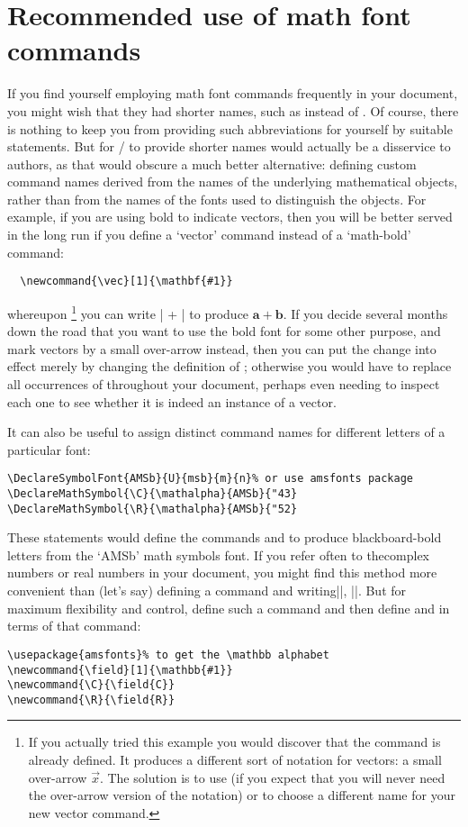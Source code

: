 \documentclass[leqno,titlepage,openany]{amsldoc}
\let\vector=\vec
\renewcommand{\vec}[1]{\mathbf{#1}}
\begin{document}
\section{Recommended use of math font commands}

If you find yourself employing math font commands frequently in your
document, you might wish that they had shorter names, such as 
instead of . Of course, there is nothing to keep you from
providing such abbreviations for yourself by suitable 
statements. But for \latex/ to provide shorter names would actually be a
disservice to authors, as that would obscure a much better alternative:
defining custom command names derived from the names of the underlying
mathematical objects, rather than from the names of the fonts used to
distinguish the objects. For example, if you are using bold to indicate
vectors, then you will be better served in the long run if you define a
`vector' command instead of a `math-bold' command:
\begin{verbatim}
  \newcommand{\vec}[1]{\mathbf{#1}}
\end{verbatim}
whereupon%
\footnote{%
If you actually tried this example you would discover that the command
 is already defined. It produces a different sort of notation
for vectors: a small over-arrow $\vector{x}$. The solution is to use
 (if you expect that you will never need the
over-arrow version of the notation) or to choose a different name for
your new vector command.}
you can write |\vec{a} + \vec{b}| to produce $\vec{a} +
\vec{b}$.
If you decide several months down the road that you want to use the bold
font for some other purpose, and mark vectors by a small over-arrow
instead, then you can put the change into effect merely by changing the
definition of ; otherwise you would have to replace all
occurrences of  throughout your document, perhaps even
needing to inspect each one to see whether it is indeed
an instance of a vector.

It can also be useful to assign distinct
command names for different letters of a particular font:
\begin{verbatim}
\DeclareSymbolFont{AMSb}{U}{msb}{m}{n}% or use amsfonts package
\DeclareMathSymbol{\C}{\mathalpha}{AMSb}{"43}
\DeclareMathSymbol{\R}{\mathalpha}{AMSb}{"52}
\end{verbatim}
These statements would define the commands  and  to produce
blackboard-bold letters from the `AMSb' math symbols font. If you refer
often to the\break complex numbers or real numbers in your document, you might
find this method more convenient than (let's say) defining a 
command and writing\break ||, ||. But for maximum
flexibility and control, define such a  command and then
define  and  in terms of that command:
\begin{verbatim}
\usepackage{amsfonts}% to get the \mathbb alphabet
\newcommand{\field}[1]{\mathbb{#1}}
\newcommand{\C}{\field{C}}
\newcommand{\R}{\field{R}}
\end{verbatim}
\end{document}
